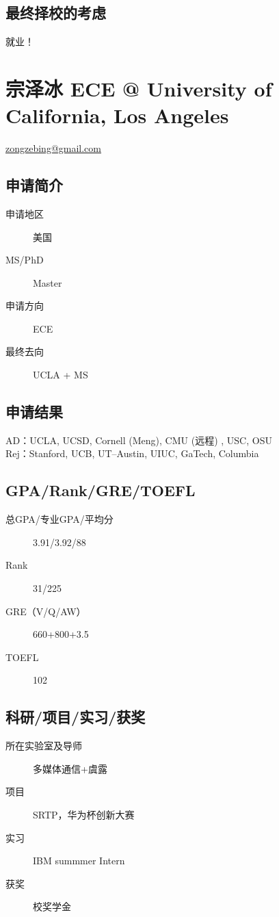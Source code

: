 \documentclass[11pt,fleqn,openany]{book} %
\begin{document}
\subsection*{最终择校的考虑}
就业！
\clearpage
\section{宗泽冰 ECE @ University of California, Los Angeles}
\hfill \href{mailto:zongzebing@gmail.com}{zongzebing@gmail.com}

\noindent\begin{minipage}[t]{0.45\textwidth}
\subsection*{申请简介}
\begin{description}
\item[申请地区] 美国
\item[MS/PhD] Master
\item[申请方向] ECE
\item[最终去向] UCLA + MS
\end{description}
\end{minipage}
\hfill
\begin{minipage}[t]{0.45\textwidth}
\subsection*{申请结果}
\noindent AD：UCLA, UCSD, Cornell (Meng), CMU (远程) , USC, OSU\\
Rej：Stanford, UCB, UT--Austin, UIUC, GaTech, Columbia
\end{minipage}
\subsection*{GPA/Rank/GRE/TOEFL}
\begin{description}
\item[总GPA/专业GPA/平均分] 3.91/3.92/88
\item[Rank] 31/225
\item[GRE（V/Q/AW）] 660+800+3.5
\item[TOEFL] 102
\end{description}

\subsection*{科研/项目/实习/获奖}
\begin{description}
\item[所在实验室及导师] 多媒体通信+虞露
\item[项目] SRTP，华为杯创新大赛
\item[实习] IBM summmer Intern
\item[获奖] 校奖学金
\end{description}
\end{document}
